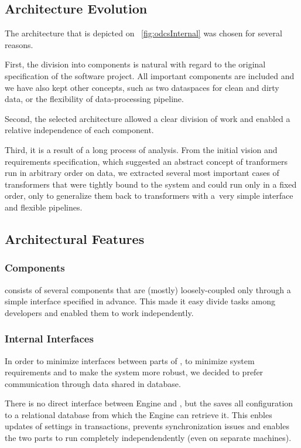 \subsection{Architecture Evolution}
The architecture that is depicted on \figurename~\ref{fig:odcsInternal} was chosen for several reasons.

First, the division into components is natural with regard to the original specification of the software project. All important components are included and we have also kept other concepts, such as two dataspaces for clean and dirty data, or the flexibility of data-processing pipeline.

Second, the selected architecture allowed a clear division of work and enabled a relative independence of each component.

Third, it is a result of a long process of analysis. From the initial vision and  requirements specification, which suggested an abstract concept of tranformers run in arbitrary order on data, we extracted several most important cases of transformers that were tightly bound to the system and could run only in a fixed order, only to generalize them back to transformers with a~very simple interface and flexible pipelines.


\subsection{Architectural Features}

\subsubsection{Components}
\odcs consists of several components that are (mostly) loosely-coupled only through a simple interface specified in advance. This made it easy divide tasks among developers and enabled them to work independently.

\subsubsection{Internal Interfaces}
In order to minimize interfaces between parts of \odcs, to minimize system requirements and to make the system more robust, we decided to prefer communication through data shared in database.

There is no direct interface between Engine and \FE, but the \FE saves all configuration to a relational database from which the Engine can retrieve it. This enbles updates of settings in transactions, prevents synchronization issues and enables the two parts to run completely independendently (even on separate machines).

